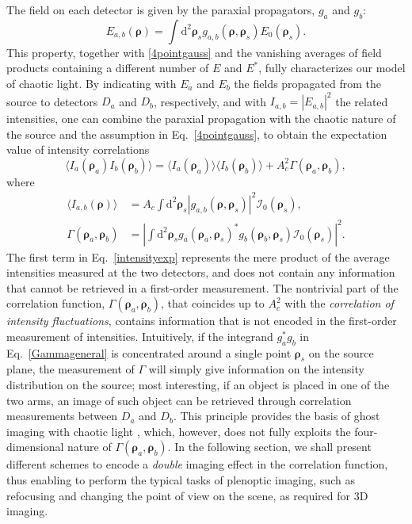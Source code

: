 \documentclass[aps,pra,amssymb,twocolumn,amsmath,superscriptaddress,showpacs,10pt]{revtex4-1}
\def\d{\mathrm{d}}
\def\I{\mathcal{I}}
\begin{document}
The field on each detector is given by the paraxial propagators, $g_a$ and $g_b$:
\begin{equation}
E_{a,b}(\bm{\rho}) = \int \d^2\bm{\rho}_s g_{a,b}(\bm{\rho},\bm{\rho}_s) E_0(\bm{\rho}_s).
\end{equation}
This property, together with \eqref{4pointgauss} and the vanishing averages of field products containing a different number of $E$ and $E^*$, fully characterizes our model of chaotic light. By indicating with $E_a$ and $E_b$ the fields propagated from the source to detectors $D_a$ and $D_b$, respectively, and with $I_{a,b}= |E_{a,b}|^2$ the related intensities, one can combine the paraxial propagation with the chaotic nature of the source and the assumption in Eq.~\eqref{4pointgauss}, to obtain the expectation value of intensity correlations
\begin{equation}\label{intensityexp}
\langle I_a(\bm{\rho}_a) I_b(\bm{\rho}_b) \rangle = \langle I_a(\bm{\rho}_a) \rangle \langle I_b(\bm{\rho}_b) \rangle + A_c^2 \Gamma(\bm{\rho}_a,\bm{\rho}_b),
\end{equation}
where
\begin{align}
\langle I_{a,b}(\bm{\rho}) \rangle & = A_c \int \d^2\bm{\rho}_s |g_{a,b}(\bm{\rho},\bm{\rho}_s)|^2 \I_0(\bm{\rho}_s) , \label{Iab} \\
\Gamma(\bm{\rho}_a,\bm{\rho}_b) & = \left| \int \d^2\bm{\rho}_s g_a(\bm{\rho}_a,\bm{\rho}_s)^* g_b(\bm{\rho}_b,\bm{\rho}_s) \I_0(\bm{\rho}_s) \right|^2 . \label{Gammageneral}
\end{align}
The first term in Eq.\ \eqref{intensityexp} represents the mere product of the average intensities measured at the two detectors, and does not contain any information that cannot be retrieved in a first-order measurement. The nontrivial part of the correlation function, $\Gamma(\bm{\rho}_a,\bm{\rho}_b)$, that coincides up to $A_c^2$ with the \textit{correlation of intensity fluctuations}, contains information that is not encoded in the first-order measurement of intensities. Intuitively, if the integrand $g_a^*g_b$ in Eq.~\eqref{Gammageneral} is concentrated around a single point $\bm{\rho}_s$ on the source plane, the measurement of $\Gamma$ will simply give information on the intensity distribution on the source; most interesting, if an object is placed in one of the two arms, an image of such object can be retrieved through correlation measurements between $D_a$ and $D_b$. This principle provides the basis of ghost imaging with chaotic light \cite{valencia,scarcelliPRL}, which, however, does not fully exploits the four-dimensional nature of $\Gamma(\bm{\rho}_a,\bm{\rho}_b)$. In the following section, we shall present different schemes to encode a \textit{double} imaging effect in the correlation function, thus enabling to perform the typical tasks of plenoptic imaging, such as refocusing and changing the point of view on the scene, as required for 3D imaging.
\end{document}
